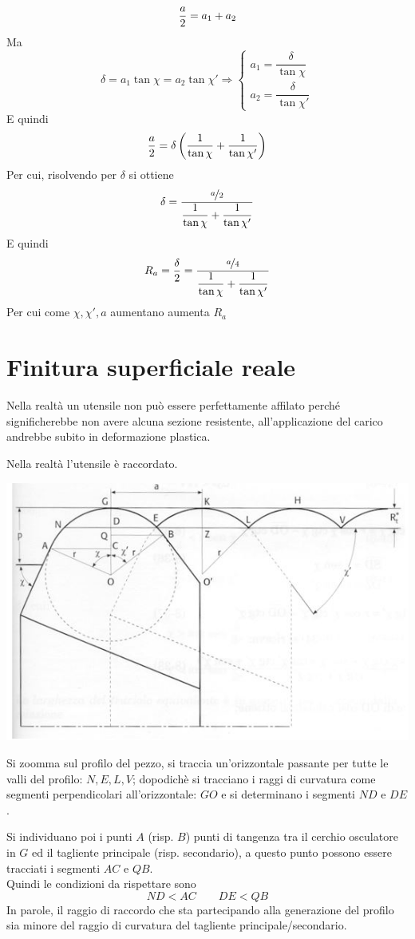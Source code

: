 \documentclass[a4paper, 15pt]{article}
\begin{document}
	\[{a\over2} = a_1 + a_2\]
	Ma
	\[\delta = a_1\tan\chi = a_2\tan\chi'
	 \Rightarrow \begin{cases}
	a_1 = \dfrac{\delta}{\tan\chi} \\
	a_2 = \dfrac{\delta}{\tan\chi'}
	\end{cases}\]
	E quindi
	\[{a\over2} = \delta\left(\dfrac{1}{\tan\chi} + \dfrac{1}{\tan\chi'}\right)\]
	Per cui, risolvendo per $\delta$ si ottiene 
	\[\delta = \dfrac{\nicefrac{a}{2}}{\dfrac{1}{\tan\chi} + \dfrac{1}{\tan\chi'}}\]
	E quindi
	\[R_a = {\delta\over2} = \dfrac{\nicefrac{a}{4}}{\dfrac{1}{\tan\chi} + \dfrac{1}{\tan\chi'}}\]
	Per cui come $\chi, \chi', a$ aumentano aumenta $R_a$
	\newpage
	\section{Finitura superficiale reale}
	Nella realtà un utensile non può essere perfettamente affilato perché significherebbe non avere alcuna sezione resistente, all'applicazione del carico andrebbe subito in deformazione plastica.
	
	Nella realtà l'utensile è raccordato. 
\begin{center}
	\includegraphics[width=0.7\linewidth]{figures/asp17}
\end{center}
	Si zoomma sul profilo del pezzo, si traccia un'orizzontale passante per tutte le valli del profilo: $N, E, L, V$; dopodichè si tracciano i raggi di curvatura come segmenti perpendicolari all'orizzontale: $GO$ e si determinano i segmenti $ND$ e $DE$. 
	
	Si individuano poi i punti $A$ (risp. $B$) punti di tangenza tra il cerchio osculatore in $G$ ed il tagliente principale (risp. secondario), a questo punto possono essere tracciati i segmenti $AC$ e $QB$. \\
	
	Quindi le condizioni da rispettare sono
	\[ND<AC\qquad DE<QB\]
	In parole, il raggio di raccordo che sta partecipando alla generazione del profilo sia minore del raggio di curvatura del tagliente principale/secondario. 
	
\end{document}
